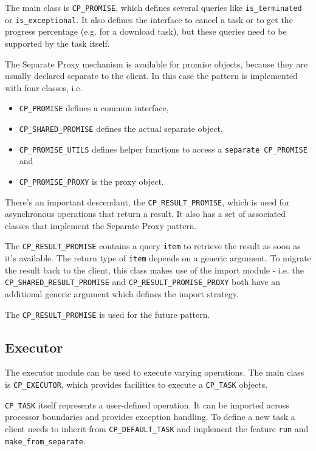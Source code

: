 \documentclass[a4paper,10pt]{report}
\begin{document}
The main class is \lstinline!CP_PROMISE!, which defines several queries like \lstinline!is_terminated! or \lstinline!is_exceptional!.
It also defines the interface to cancel a task or to get the progress percentage (e.g. for a download task), but these queries need to be supported by the task itself.

The Separate Proxy mechanism is available for promise objects, because they are usually declared separate to the client.
In this case the pattern is implemented with four classes, i.e.
\begin{itemize}
 \item \lstinline!CP_PROMISE! defines a common interface,
 \item \lstinline!CP_SHARED_PROMISE! defines the actual separate object,
 \item \lstinline!CP_PROMISE_UTILS! defines helper functions to access a \lstinline!separate CP_PROMISE! and
 \item \lstinline!CP_PROMISE_PROXY! is the proxy object.
\end{itemize}

There's an important descendant, the \lstinline!CP_RESULT_PROMISE!, which is used for asynchronous operations that return a result.
It also has a set of associated classes that implement the Separate Proxy pattern.

The \lstinline!CP_RESULT_PROMISE! contains a query \lstinline!item! to retrieve the result as soon as it's available.
The return type of \lstinline!item! depends on a generic argument.
To migrate the result back to the client, this class makes use of the import module - i.e. the \lstinline!CP_SHARED_RESULT_PROMISE! and \lstinline!CP_RESULT_PROMISE_PROXY! both have an additional generic argument which defines the import strategy.

The \lstinline!CP_RESULT_PROMISE! is used for the future pattern.

\subsection{Executor}

The executor module can be used to execute varying operations.
The main class is \lstinline!CP_EXECUTOR!, which provides facilities to execute a \lstinline!CP_TASK! objects.

\lstinline!CP_TASK! itself represents a user-defined operation.
It can be imported across processor boundaries and provides exception handling.
To define a new task a client needs to inherit from \lstinline!CP_DEFAULT_TASK! and implement the feature \lstinline!run! and \lstinline!make_from_separate!.
\end{document}
